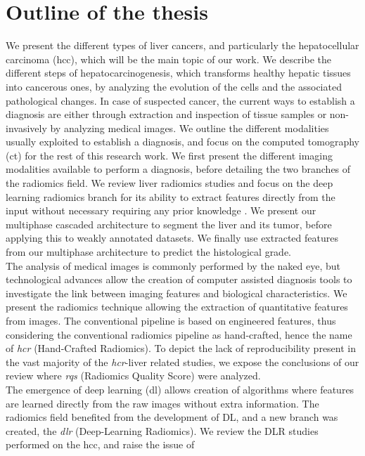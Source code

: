 \section{Outline of the thesis}
We present the different types of liver cancers, and particularly the
hepatocellular carcinoma (\ac{hcc}), which will be the main topic of our work.
We describe the different steps of hepatocarcinogenesis, which
transforms healthy hepatic tissues into cancerous ones, by analyzing the
evolution of the cells and the associated pathological changes. 
In case of suspected cancer, the current ways to establish a diagnosis 
are either through extraction and inspection of tissue samples or 
non-invasively by analyzing medical images.  We outline the different modalities usually exploited to establish a
diagnosis, and focus on the computed tomography (\ac{ct}) for the rest of this
research work.  We first present the different imaging modalities available to perform a
diagnosis, before detailing the two branches of the radiomics field. We
review liver radiomics studies and focus on the deep learning radiomics
branch for its ability to extract features directly from the input without 
necessary requiring any prior knowledge . We present our multiphase 
cascaded architecture to segment the liver and
its tumor, before applying this to weakly annotated datasets. We finally
use extracted features from our multiphase architecture to predict the
histological grade. \\
The analysis of medical images is commonly performed by the naked eye,
but technological advances allow the creation of computer assisted
diagnosis tools to investigate the link between imaging features 
and biological characteristics.
We present the radiomics technique allowing the extraction of
quantitative features from images. The conventional pipeline is based on 
engineered features, thus considering the conventional radiomics pipeline as
hand-crafted, hence the name of \emph{\ac{hcr}} (Hand-Crafted Radiomics).
To depict the lack of reproducibility present in the vast majority of
the \emph{\ac{hcr}}-liver related studies, we expose the conclusions of our
review where \emph{\ac{rqs}} (Radiomics Quality Score) were analyzed. \\
The emergence of deep learning (\ac{dl}) allows creation of algorithms where
features are learned directly from the raw images without extra information. 
The radiomics field benefited from the development of DL, and a new branch 
was created, the \emph{\ac{dlr}} (Deep-Learning Radiomics).
We review the DLR studies performed on the \ac{hcc}, and raise the issue of
